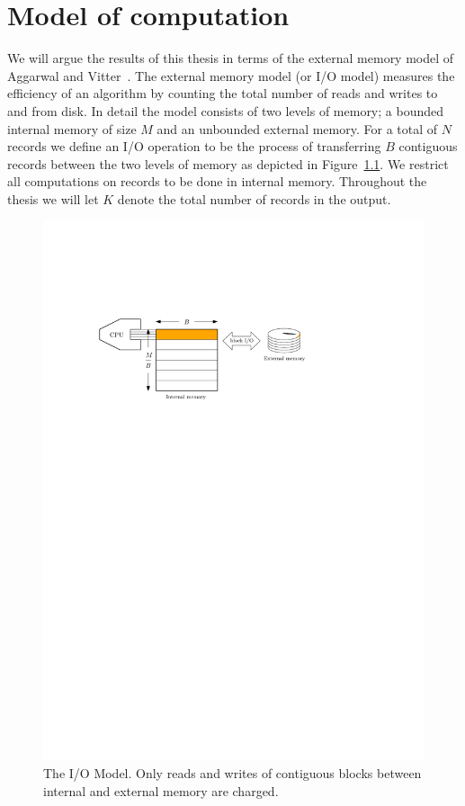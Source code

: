 \documentclass[twoside,11pt,openright]{report}
\begin{document}
\chapter{Model of computation}
\label{chp:iomodel}
We will argue the results of this thesis in terms of the external memory model of Aggarwal and Vitter~\cite{Aggarwal:1988/ICS/48529.48535}.
The external memory model (or I/O model) measures the efficiency of an algorithm by counting the total number of reads and writes to and from disk. In detail the model consists of two levels of memory; a bounded internal memory of size $M$ and an unbounded external memory. For a total of $N$ records we define an I/O operation to be the process of transferring $B$ contiguous records between the two levels of memory as depicted in Figure~\ref{fig:io_model}. We restrict all computations on records to be done in internal memory. Throughout the thesis we will let $K$ denote the total number of records in the output.

\begin{figure}[h]
	\centering
	\includegraphics[width=1\textwidth]{../figures/block_io}
	\caption{The I/O Model. Only reads and writes of contiguous blocks between internal and external memory are charged.}
	\label{fig:io_model}
\end{figure}
\end{document}
